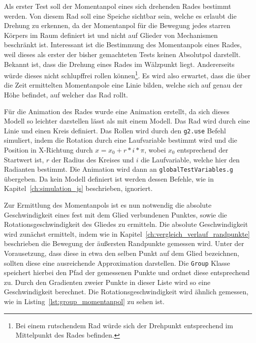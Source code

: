 Als erster Test soll der Momentanpol eines sich drehenden Rades bestimmt werden.
Von diesem Rad soll eine Speiche sichtbar sein, welche es erlaubt die Drehung zu erkennen, da der Momentanpol für die Bewegung jedes starren Körpers im Raum definiert ist und nicht auf Glieder von Mechanismen beschränkt ist.
Interessant ist die Bestimmung des Momentanpols eines Rades, weil dieses als erster der bisher gemachteten Tests keinen Absolutpol darstellt.
Bekannt ist, dass die Drehung eines Rades im Wälzpunkt liegt.
Andererseits würde dieses nicht schlupffrei rollen können\footnote{Bei einem rutschendem Rad würde sich der Drehpunkt entsprechend im Mittelpunkt des Rades befinden.}.
Es wird also erwartet, dass die über die Zeit ermittelten Momentanpole eine Linie bilden, welche sich auf genau der Höhe befindet, auf welcher das Rad rollt.

Für die Animation des Rades wurde eine  Animation erstellt,
da sich dieses Modell so leichter darstellen lässt als mit einem  Modell.
Das Rad wird durch eine Linie und einen Kreis definiert.
Das Rollen wird durch den \lstinline{g2.use} Befehl simuliert, indem die Rotation durch eine Laufvariable bestimmt wird und die Position in X-Richtung durch $x = x_0 + r * i * \pi$, wobei $x_0$ entsprechend der Startwert ist, $r$ der Radius des Kreises und $i$ die Laufvariable, welche hier den Radianten bestimmt.
Die Animation wird dann an \lstinline{globalTestVariables.g} übergeben.
Da kein  Modell definiert ist werden dessen Befehle, wie in Kapitel~\ref{ch:simulation_js} beschrieben, ignoriert.

Zur Ermittlung des Momentanpols ist es nun notwendig die absolute Geschwindigkeit eines fest mit dem Glied verbundenen Punktes, sowie die Rotationsgeschwindigkeit des Gliedes zu ermitteln.
Die absolute Geschwindigkeit wird zunächst ermittelt, indem wie in Kapitel~\ref{ch:vergleich_verlauf_randpunkte} beschrieben die Bewegung der äu{\ss}ersten Randpunkte gemessen wird.
Unter der Vorausetzung, dass diese in etwa den selben Punkt auf dem Glied bezeichnen, sollten diese eine ausreichende Approximation darstellen.
Die \lstinline{Group} Klasse speichert hierbei den Pfad der gemessenen Punkte und ordnet diese entsprechend zu.
Durch den Gradienten zweier Punkte in dieser Liste wird so eine Geschwindigkeit berechnet.
Die Rotationsgeschwindigkeit wird ähnlich gemessen, wie in Listing~\ref{lst:group_momentanpol} zu sehen ist.

